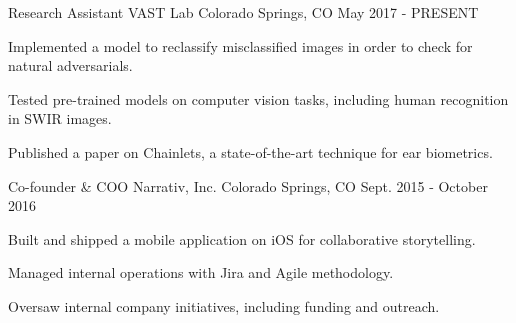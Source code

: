 

\begin{cventries}

  \cventry
    {Research Assistant} %
    {VAST Lab} %
    {Colorado Springs, CO} %
    {May 2017 - PRESENT} %
    {
      \begin{cvitems} %
        \item {Implemented a model to reclassify misclassified images in order to check for natural adversarials.}
        \item {Tested pre-trained models on computer vision tasks, including human recognition in SWIR images.}
        \item {Published a paper on Chainlets, a state-of-the-art technique for ear biometrics.}
      \end{cvitems}
    }

  \cventry
    {Co-founder \& COO} %
    {Narrativ, Inc.} %
    {Colorado Springs, CO} %
    {Sept. 2015 - October 2016} %
    {
      \begin{cvitems} %
        \item {Built and shipped a mobile application on iOS for collaborative storytelling. }
        \item {Managed internal operations with Jira and Agile methodology. }
        \item {Oversaw internal company initiatives, including funding and outreach. }
      \end{cvitems}
    }

\end{cventries}
